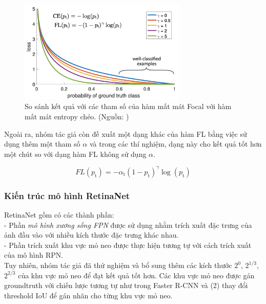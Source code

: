 {    \begin{figure}[H]
        \centering
        \includegraphics[width=8cm] {images/retinanet_focal_loss_curve}
        \caption{So sánh kết quả với các tham số của hàm mất mát Focal với hàm mất mát entropy chéo. (Nguồn: \cite{lin2017focal})}
        \label{fig:retinanet_focal_loss_curve}
    \end{figure}

    \noindent
    Ngoài ra, nhóm tác giả còn đề xuất một dạng khác của hàm FL bằng việc sử dụng thêm một tham số $\alpha$ và trong các thí nghiệm, dạng này cho kết quả tốt hơn một chút so với dạng hàm FL không sử dụng $\alpha$.

    \begin{equation}
        FL(p_\textrm{t}) = - \alpha_\textrm{t} (1 - p_\textrm{t})^\gamma \log (p_\textrm{t})
    \end{equation}
    
    \subsubsection*{Kiến trúc mô hình RetinaNet}
    RetinaNet gồm có các thành phần: \\
    - Phần \textit{mô hình xương sống FPN} được sử dụng nhằm trích xuất đặc trưng của ảnh đầu vào với nhiều kích thước đặc trưng khác nhau. \\
    - Phần trích xuất khu vực mỏ neo được thực hiện tương tự với cách trích xuất của mô hình RPN. \\
    Tuy nhiên, nhóm tác giả đã thử nghiệm và bổ sung thêm các kích thước $2^{0}$, $2^{1/3}$, $2^{2/3}$ của khu vực mỏ neo để đạt kết quả tốt hơn.
    Các khu vực mỏ neo được gán groundtruth với chiến lược tương tự như trong Faster R-CNN \cite{ren2015faster} và (2) thay đổi threshold IoU để gán nhãn cho từng khu vực mỏ neo.

}
